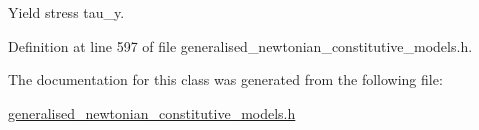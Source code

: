 Yield stress tau\+\_\+y. 



Definition at line 597 of file generalised\+\_\+newtonian\+\_\+constitutive\+\_\+models.\+h.



The documentation for this class was generated from the following file\+:\begin{DoxyCompactItemize}
\item 
\hyperlink{generalised__newtonian__constitutive__models_8h}{generalised\+\_\+newtonian\+\_\+constitutive\+\_\+models.\+h}\end{DoxyCompactItemize}
